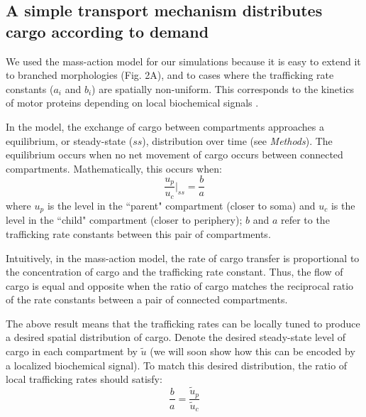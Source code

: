 \documentclass[11pt]{wlpeerj}
\begin{document}
\subsection*{A simple transport mechanism distributes cargo according to demand}

We used the mass-action model for our simulations because it is easy to extend it to branched morphologies (Fig. 2A), and to cases where the trafficking rate constants ($a_i$ and $b_i$) are spatially non-uniform.
This corresponds to the kinetics of motor proteins depending on local biochemical signals \citep{Mironov_2007,Wang_2009,Soundararajan_2014}.

In the model, the exchange of cargo between compartments approaches a equilibrium, or steady-state ($ss$), distribution over time (see \textit{Methods}). The equilibrium occurs when no net movement of cargo occurs between connected compartments. Mathematically, this occurs when:
\begin{equation}
\frac{u_p}{u_c} \Bigg|_{ss} = \frac{b}{a}
\end{equation}
where $u_p$ is the level in the ``parent" compartment (closer to soma) and $u_c$ is the level in the ``child" compartment (closer to periphery); $b$ and $a$ refer to the trafficking rate constants between this pair of compartments.

Intuitively, in the mass-action model, the rate of cargo transfer is proportional to the concentration of cargo and the trafficking rate constant. Thus, the flow of cargo is equal and opposite when the ratio of cargo matches the reciprocal ratio of the rate constants between a pair of connected compartments.

The above result means that the trafficking rates can be locally tuned to produce a desired spatial distribution of cargo. Denote the desired steady-state level of cargo in each compartment by $\tilde{u}$ (we will soon show how this can be encoded by a localized biochemical signal). To match this desired distribution, the ratio of local trafficking rates should satisfy:
\begin{equation}
\frac{b}{a} = \frac{\tilde{u}_p}{\tilde{u}_c}
\end{equation}
\end{document}
